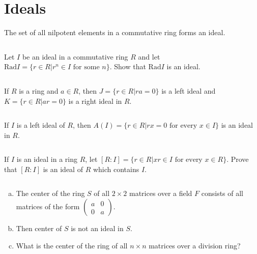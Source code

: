 \section{Ideals}
\begin{ex}
    The set of all nilpotent elements in a commutative ring forms an ideal.
\end{ex}

$$ $$

\begin{ex}
    Let $I$ be an ideal in a commutative ring $R$ and let $\mathrm{Rad} I=\{r\in R| r^{n}\in I \text{ for some } n\}$. Show that $\mathrm{Rad}I$ is an ideal.
\end{ex}

$$ $$

\begin{ex}
    If $R$ is a ring and $a\in R$, then $J=\{r\in R|ra=0\}$ is a left ideal and $K=\{r\in R|ar=0\}$ is a right ideal in $R$.
\end{ex}

$$ $$

\begin{ex}
    If $I$ is a left ideal of $R$, then $A(I)=\{r\in R|rx=0 \text{ for every }x\in I\}$ is an ideal in $R$.
\end{ex}

$$ $$

\begin{ex}
    If $I$ is an ideal in a ring $R$, let $\left[R:I\right]=\{r\in R|xr\in I \text{ for every }x\in R\}$. Prove that $\left[ R:I\right]$ is an ideal of $R$ which contains $I$.
\end{ex}

$$ $$

\begin{ex}
    \begin{enumerate}[(a)]
        \item The center of the ring $S$ of all $2\times 2$ matrices over a field $F$ consists of all matrices of the form $\begin{pmatrix}
            a&0\\0&a
        \end{pmatrix}$.
        \item Then center of $S$ is not an ideal in $S$.
        \item What is the center of the ring of all $n\times n$ matrices over a division ring?
    \end{enumerate}
\end{ex}

